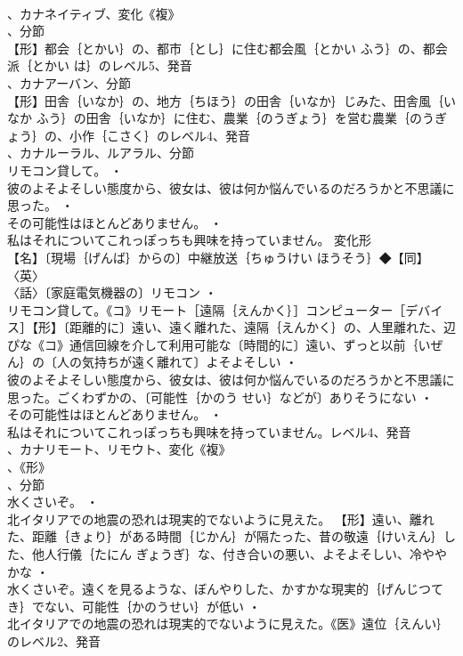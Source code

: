\documentclass[8pt]{extreport}
\begin{document}
\begin{CJK}{UTF8}{min}
\\	、カナネイティブ、変化《複》
\\	、分節
\\	【形】都会｛とかい｝の、都市｛とし｝に住む都会風｛とかい ふう｝の、都会派｛とかい は｝のレベル5、発音
\\	、カナアーバン、分節
\\	【形】田舎｛いなか｝の、地方｛ちほう｝の田舎｛いなか｝じみた、田舎風｛いなか ふう｝の田舎｛いなか｝に住む、農業｛のうぎょう｝を営む農業｛のうぎょう｝の、小作｛こさく｝のレベル4、発音
\\	、カナルーラル、ルアラル、分節
\\	リモコン貸して。 ・
\\	彼のよそよそしい態度から、彼女は、彼は何か悩んでいるのだろうかと不思議に思った。 ・
\\	その可能性はほとんどありません。 ・
\\	私はそれについてこれっぽっちも興味を持っていません。	変化形 
\\	【名】〔現場｛げんば｝からの〕中継放送｛ちゅうけい ほうそう｝◆【同】
\\	〈英〉
\\	〈話〉〔家庭電気機器の〕リモコン ・
\\	リモコン貸して。《コ》リモート［遠隔｛えんかく｝］コンピューター［デバイス］【形】〔距離的に〕遠い、遠く離れた、遠隔｛えんかく｝の、人里離れた、辺ぴな《コ》通信回線を介して利用可能な〔時間的に〕遠い、ずっと以前｛いぜん｝の〔人の気持ちが遠く離れて〕よそよそしい ・
\\	彼のよそよそしい態度から、彼女は、彼は何か悩んでいるのだろうかと不思議に思った。ごくわずかの、〔可能性｛かのう せい｝などが〕ありそうにない ・
\\	その可能性はほとんどありません。 ・
\\	私はそれについてこれっぽっちも興味を持っていません。レベル4、発音
\\	、カナリモート、リモウト、変化《複》
\\	、《形》
\\	、分節
\\	水くさいぞ。 ・
\\	北イタリアでの地震の恐れは現実的でないように見えた。		【形】遠い、離れた、距離｛きょり｝がある時間｛じかん｝が隔たった、昔の敬遠｛けいえん｝した、他人行儀｛たにん ぎょうぎ｝な、付き合いの悪い、よそよそしい、冷ややかな ・
\\	水くさいぞ。遠くを見るような、ぼんやりした、かすかな現実的｛げんじつてき｝でない、可能性｛かのうせい｝が低い ・
\\	北イタリアでの地震の恐れは現実的でないように見えた。《医》遠位｛えんい｝のレベル2、発音

\end{CJK}
\end{document}
